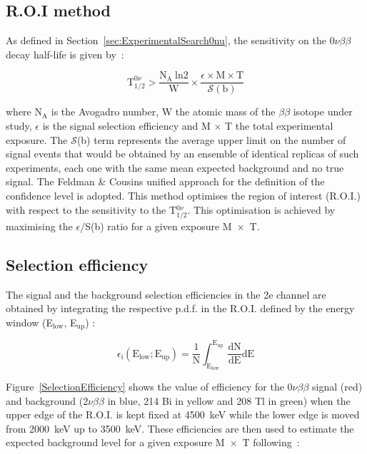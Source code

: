 \documentclass[main.tex]{subfiles}
\begin{document}
\subsection{R.O.I method}\label{sec:ROImethod}


\NI As defined in Section~\ref{sec:ExperimentalSearch0nu}, the sensitivity on the 0$\nu\beta\beta$ decay half-life is given by~:


\begin{equation}\label{eq:limitHalfLife}
\text{T}_{\text{1/2}}^{\text{0}\nu} > \frac{\text{N}_\text{A}~\text{ln2}}{\text{W}} \times \frac{\epsilon \times \text{M} \times \text{T}}{\mathcal{S}(\text{b})}
\end{equation}


\NI where N$_\text{A}$ is the Avogadro number, W the atomic mass of the $\beta\beta$ isotope under study, $\epsilon$ is the signal selection efficiency and M $\times$ T the total experimental exposure. The $\mathcal{S}$(b) term represents the average upper limit on the number of signal events that would be obtained by an ensemble of identical replicas of such experiments, each one with the same mean expected background and no true signal. The Feldman \& Cousins unified approach for the definition of the confidence level is adopted. This method optimises the region of interest (R.O.I.) with respect to the sensitivity to the T$_{\text{1/2}}^{\text{0}\nu}$. This optimisation is achieved by maximising the $\epsilon$/S(b) ratio for a given exposure M~$\times$~T.


\subsection{Selection efficiency}


\NI The signal and the background selection efficiencies in the 2e channel are obtained by integrating the respective p.d.f. in the R.O.I. defined by the energy window (E$_{\text{low}}$, E$_{\text{up}}$) : 


\begin{equation}\label{eq:CompuationEfficiency}
\epsilon_\text{i} (\text{E}_{\text{low}};\text{E}_{\text{up}}) = \frac{1}{\text{N}} \int_{\text{E}_{\text{low}}}^{\text{E}_{\text{up}}} \frac{\text{dN}}{\text{dE}} \text{dE}
\end{equation}


\bigskip


\NI Figure~\ref{SelectionEfficiency} shows the value of efficiency for the 0$\nu\beta\beta$ signal (red) and background (2$\nu\beta\beta$ in blue, 214 Bi in yellow and 208 Tl in green) when the upper edge of the R.O.I. is kept fixed at 4500~keV while the lower edge is moved from 2000~keV up to 3500~keV. These efficiencies are then used to estimate the expected background level for a given exposure M~$\times$~T following~:
\end{document}
